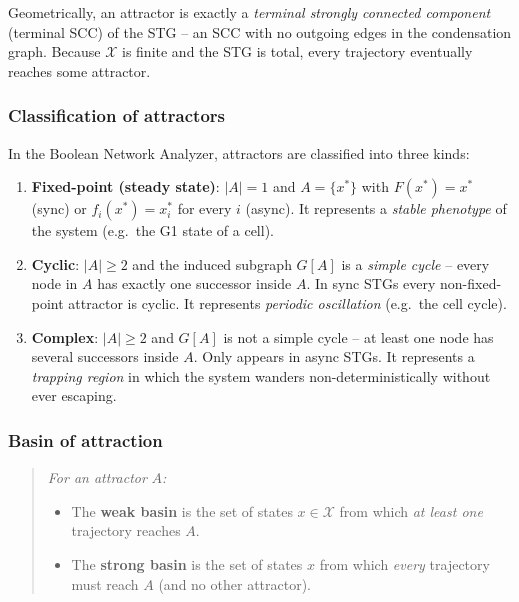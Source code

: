\documentclass[oneside,final]{hcmut-report}
\begin{document}
Geometrically, an attractor is exactly a \textit{terminal strongly connected component} (terminal SCC) of the STG -- an SCC with no outgoing edges in the condensation graph. Because $\mathcal{X}$ is finite and the STG is total, every trajectory eventually reaches some attractor.

\subsubsection{Classification of attractors}

In the Boolean Network Analyzer, attractors are classified into three kinds:

\begin{enumerate}[leftmargin=*]
    \item \textbf{Fixed-point (steady state)}: $|A| = 1$ and $A = \{x^*\}$ with $F(x^*) = x^*$ (sync) or $f_i(x^*) = x_i^*$ for every $i$ (async). It represents a \textit{stable phenotype} of the system (e.g.\ the G1 state of a cell).
    \item \textbf{Cyclic}: $|A| \geq 2$ and the induced subgraph $G[A]$ is a \textit{simple cycle} -- every node in $A$ has exactly one successor inside $A$. In sync STGs every non-fixed-point attractor is cyclic. It represents \textit{periodic oscillation} (e.g.\ the cell cycle).
    \item \textbf{Complex}: $|A| \geq 2$ and $G[A]$ is not a simple cycle -- at least one node has several successors inside $A$. Only appears in async STGs. It represents a \textit{trapping region} in which the system wanders non-deterministically without ever escaping.
\end{enumerate}

\subsubsection{Basin of attraction}

\begin{quote}
\textit{For an attractor} $A$\textit{:}
\begin{itemize}[leftmargin=*]
    \item The \textbf{weak basin} is the set of states $x \in \mathcal{X}$ from which \textit{at least one} trajectory reaches $A$.
    \item The \textbf{strong basin} is the set of states $x$ from which \textit{every} trajectory must reach $A$ (and no other attractor).
\end{itemize}
\end{quote}
\end{document}
